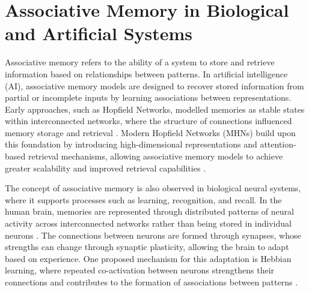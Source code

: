\section{Associative Memory in Biological and Artificial Systems}

Associative memory refers to the ability of a system to store and retrieve information based on relationships between patterns. In artificial intelligence (AI), associative memory models are designed to recover stored information from partial or incomplete inputs by learning associations between representations. Early approaches, such as Hopfield Networks, modelled memories as stable states within interconnected networks, where the structure of connections influenced memory storage and retrieval \cite{hopfield1982}. Modern Hopfield Networks (MHNs) build upon this foundation by introducing high-dimensional representations and attention-based retrieval mechanisms, allowing associative memory models to achieve greater scalability and improved retrieval capabilities \cite{ramsauer2021hopfield}.

The concept of associative memory is also observed in biological neural systems, where it supports processes such as learning, recognition, and recall. In the human brain, memories are represented through distributed patterns of neural activity across interconnected networks rather than being stored in individual neurons \cite{kandel2013principles}. The connections between neurons are formed through synapses, whose strengths can change through synaptic plasticity, allowing the brain to adapt based on experience. One proposed mechanism for this adaptation is Hebbian learning, where repeated co-activation between neurons strengthens their connections and contributes to the formation of associations between patterns \cite{hebb1949organization}. 